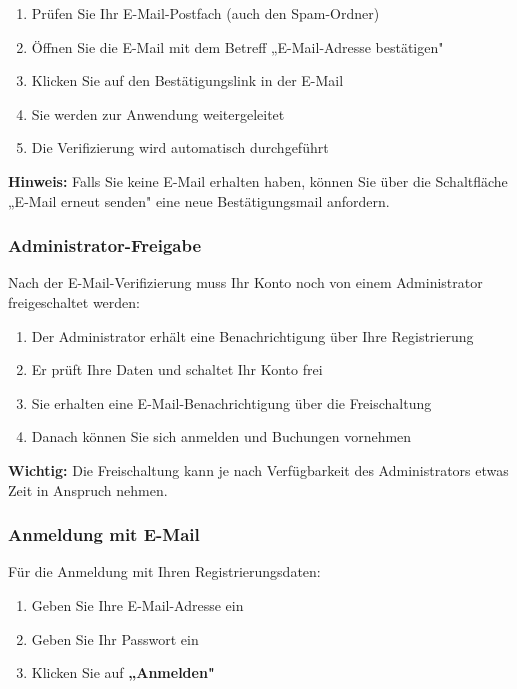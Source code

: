 \begin{enumerate}
    \item Prüfen Sie Ihr E-Mail-Postfach (auch den Spam-Ordner)
    \item Öffnen Sie die E-Mail mit dem Betreff „E-Mail-Adresse bestätigen"
    \item Klicken Sie auf den Bestätigungslink in der E-Mail
    \item Sie werden zur Anwendung weitergeleitet
    \item Die Verifizierung wird automatisch durchgeführt
\end{enumerate}

\textbf{Hinweis:} Falls Sie keine E-Mail erhalten haben, können Sie über die Schaltfläche „E-Mail erneut senden" eine neue Bestätigungsmail anfordern.

\subsubsection{Administrator-Freigabe}

Nach der E-Mail-Verifizierung muss Ihr Konto noch von einem Administrator freigeschaltet werden:

\begin{enumerate}
    \item Der Administrator erhält eine Benachrichtigung über Ihre Registrierung
    \item Er prüft Ihre Daten und schaltet Ihr Konto frei
    \item Sie erhalten eine E-Mail-Benachrichtigung über die Freischaltung
    \item Danach können Sie sich anmelden und Buchungen vornehmen
\end{enumerate}

\textbf{Wichtig:} Die Freischaltung kann je nach Verfügbarkeit des Administrators etwas Zeit in Anspruch nehmen.

\subsubsection{Anmeldung mit E-Mail}

Für die Anmeldung mit Ihren Registrierungsdaten:

\begin{enumerate}
    \item Geben Sie Ihre E-Mail-Adresse ein
    \item Geben Sie Ihr Passwort ein
    \item Klicken Sie auf \textbf{„Anmelden"}
\end{enumerate}

